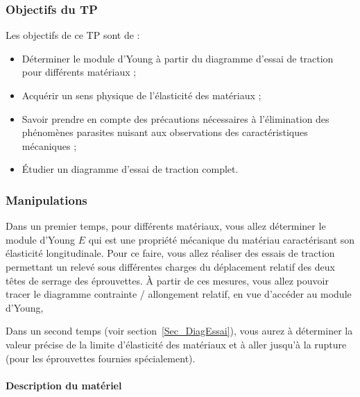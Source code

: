 \documentclass[lecture.tex]{subfiles}
\begin{document}
\subsubsection{Objectifs du TP}
Les objectifs de ce TP sont de :
\begin{itemize}[label=,font=\tiny]
\item Déterminer le module d'Young à partir du diagramme d'essai de traction pour différents matériaux ;
\item Acquérir un sens physique de l'élasticité des matériaux ;
\item Savoir prendre en compte des précautions nécessaires à l'élimination des phénomènes parasites nuisant aux observations des caractéristiques mécaniques ;
\item \'Etudier un diagramme d'essai de traction complet.
\end{itemize}

\subsubsection{Manipulations}
Dans un premier temps,  pour différents matériaux, vous allez déterminer le module d'Young $E$ qui est une propriété mécanique du matériau caractérisant son élasticité longitudinale. Pour ce faire, vous allez réaliser des essais de traction permettant un relevé sous différentes charges du déplacement relatif des deux têtes de serrage des éprouvettes. À partir de ces mesures, vous allez pouvoir tracer le diagramme contrainte / allongement relatif, en vue d'accéder au module d'Young,

Dans un second temps (voir section~\ref{Sec_DiagEssai}), vous aurez à déterminer la valeur précise de la limite d'élasticité des matériaux et à aller jusqu'à la rupture (pour les éprouvettes fournies spécialement).

\paragraph*{Description du matériel}
\noindent
\end{document}
